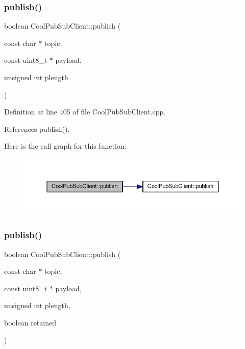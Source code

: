 \subsubsection{\texorpdfstring{publish()}{publish()}\hspace{0.1cm}{\footnotesize\ttfamily [3/4]}}
{\footnotesize\ttfamily boolean Cool\+Pub\+Sub\+Client\+::publish (\begin{DoxyParamCaption}\item[{const char $\ast$}]{topic,  }\item[{const uint8\+\_\+t $\ast$}]{payload,  }\item[{unsigned int}]{plength }\end{DoxyParamCaption})}



Definition at line 405 of file Cool\+Pub\+Sub\+Client.\+cpp.



References publish().

Here is the call graph for this function\+:
\nopagebreak
\begin{figure}[H]
\begin{center}
\leavevmode
\includegraphics[width=350pt]{d8/d4b/class_cool_pub_sub_client_abf184c0968a6655b68b5fdfbbc0c87d1_cgraph}
\end{center}
\end{figure}
\mbox{\label{class_cool_pub_sub_client_adef968760eb87b70e3fed03e60da76f7}} 
\subsubsection{\texorpdfstring{publish()}{publish()}\hspace{0.1cm}{\footnotesize\ttfamily [4/4]}}
{\footnotesize\ttfamily boolean Cool\+Pub\+Sub\+Client\+::publish (\begin{DoxyParamCaption}\item[{const char $\ast$}]{topic,  }\item[{const uint8\+\_\+t $\ast$}]{payload,  }\item[{unsigned int}]{plength,  }\item[{boolean}]{retained }\end{DoxyParamCaption})}



